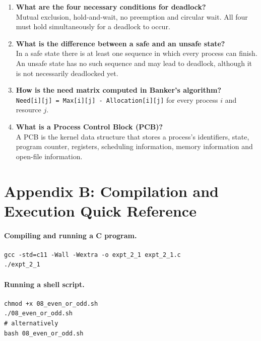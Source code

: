\begin{enumerate}
    \item \textbf{What are the four necessary conditions for deadlock?}\\
    Mutual exclusion, hold-and-wait, no preemption and circular wait. All four must hold simultaneously for a deadlock to occur.

    \item \textbf{What is the difference between a safe and an unsafe state?}\\
    In a safe state there is at least one sequence in which every process can finish. An unsafe state has no such sequence and may lead to deadlock, although it is not necessarily deadlocked yet.

    \item \textbf{How is the need matrix computed in Banker's algorithm?}\\
    \texttt{Need[i][j] = Max[i][j] - Allocation[i][j]} for every process $i$ and resource $j$.

    \item \textbf{What is a Process Control Block (PCB)?}\\
    A PCB is the kernel data structure that stores a process's identifiers, state, program counter, registers, scheduling information, memory information and open-file information.
\end{enumerate}

\newpage
\section*{Appendix B: Compilation and Execution Quick Reference}

\paragraph{Compiling and running a C program.}
\begin{lstlisting}[style=terminal]
gcc -std=c11 -Wall -Wextra -o expt_2_1 expt_2_1.c
./expt_2_1
\end{lstlisting}

\paragraph{Running a shell script.}
\begin{lstlisting}[style=terminal]
chmod +x 08_even_or_odd.sh
./08_even_or_odd.sh
# alternatively
bash 08_even_or_odd.sh
\end{lstlisting}

